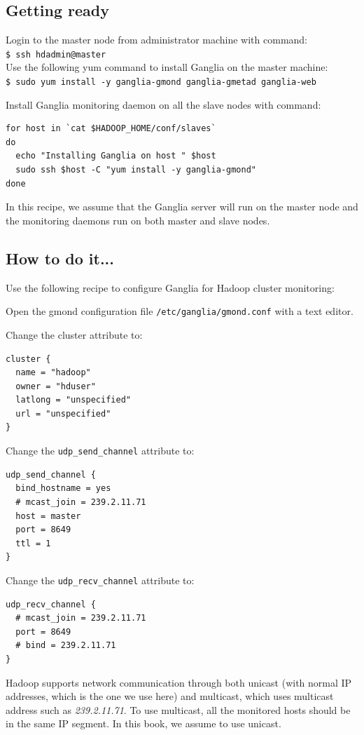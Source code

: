 \subsection*{Getting ready}
Login to the master node from administrator machine with command: \\
\verb|$ ssh hdadmin@master| \\

Use the following yum command to install Ganglia on the master machine: \\
\verb|$ sudo yum install -y ganglia-gmond ganglia-gmetad ganglia-web|

Install Ganglia monitoring daemon on all the slave nodes with command:
\begin{verbatim}
for host in `cat $HADOOP_HOME/conf/slaves`
do
  echo "Installing Ganglia on host " $host
  sudo ssh $host -C "yum install -y ganglia-gmond"
done
\end{verbatim}

In this recipe, we assume that the Ganglia server will run on the master node and the monitoring daemons run on both master and slave nodes.
\subsection*{How to do it...}
 Use the following recipe to configure Ganglia for Hadoop cluster monitoring:

Open the gmond configuration file \verb|/etc/ganglia/gmond.conf| with a text editor.

Change the cluster attribute to:
\begin{verbatim}
cluster {
  name = "hadoop"
  owner = "hduser"
  latlong = "unspecified"
  url = "unspecified"
}
\end{verbatim}

Change the \verb|udp_send_channel| attribute to: 
\begin{verbatim}
udp_send_channel {
  bind_hostname = yes
  # mcast_join = 239.2.11.71
  host = master
  port = 8649
  ttl = 1
}
\end{verbatim}

Change the \verb|udp_recv_channel| attribute to: 
\begin{verbatim}
udp_recv_channel {
  # mcast_join = 239.2.11.71
  port = 8649
  # bind = 239.2.11.71
}
\end{verbatim}

Hadoop supports network communication through both unicast (with normal IP addresses, which is the one we use here) and multicast, which uses multicast address such as \emph{239.2.11.71}. To use multicast, all the monitored hosts should be in the same IP segment. In this book, we assume to use unicast.

